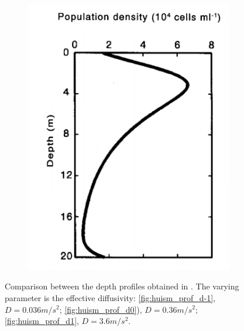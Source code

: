 \begin{figure}
\begin{subfigure}[b]{0.3\textwidth}
        \includegraphics[width=\textwidth]{img/H_dep_prof_d1}
        \caption{}
        \label{fig:huism_prof_d1}
    \end{subfigure}
    \caption{Comparison between the depth profiles obtained in \autocite{Huisman2002HowPersist}. The varying parameter is the effective diffusivity: \autoref{fig:huism_prof_d-1}, \(D=0.036m/s^2\); \autoref{fig:huism_prof_d0}), \(D=0.36m/s^2\); \autoref{fig:huism_prof_d1}, \(D=3.6m/s^2\).}
    \label{img:stoc_refl_depth_profiles_cfr}
\end{figure}
 
